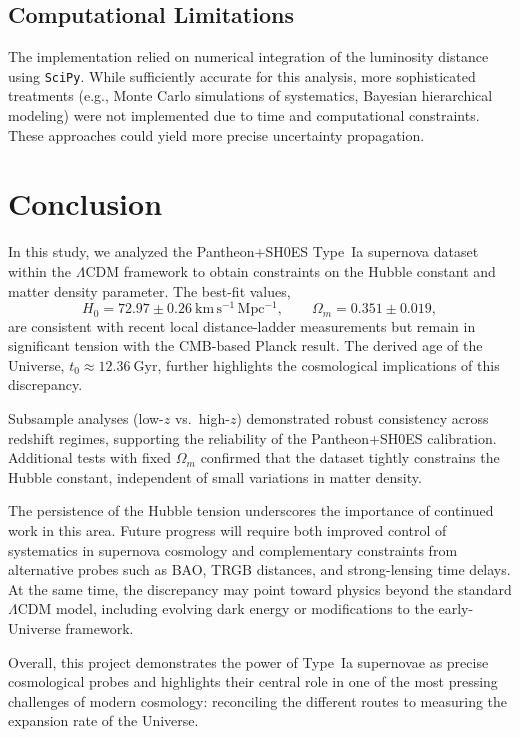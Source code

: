 \documentclass[12pt]{article}
\begin{document}
\subsection*{Computational Limitations}
The implementation relied on numerical integration of the luminosity distance using \texttt{SciPy}. While sufficiently accurate for this analysis, more sophisticated treatments 
(e.g., Monte Carlo simulations of systematics, Bayesian hierarchical modeling) were not implemented due to time and computational constraints. These approaches could yield more precise uncertainty propagation.

\section{Conclusion}
In this study, we analyzed the Pantheon+SH0ES Type~Ia supernova dataset within the $\Lambda$CDM framework to obtain constraints on the Hubble constant and matter density parameter. 
The best-fit values,
\[
H_0 = 72.97 \pm 0.26 \ \mathrm{km\,s^{-1}\,Mpc^{-1}}, \qquad \Omega_m = 0.351 \pm 0.019,
\]
are consistent with recent local distance-ladder measurements but remain in significant tension with the CMB-based Planck result. The derived age of the Universe, $t_0 \approx 12.36 \ \mathrm{Gyr}$, 
further highlights the cosmological implications of this discrepancy.

Subsample analyses (low-$z$ vs.\ high-$z$) demonstrated robust consistency across redshift regimes, supporting the reliability of the Pantheon+SH0ES calibration. Additional tests with 
fixed $\Omega_m$ confirmed that the dataset tightly constrains the Hubble constant, independent of small variations in matter density.

The persistence of the Hubble tension underscores the importance of continued work in this area. Future progress will require both improved control of systematics in supernova cosmology and complementary 
constraints from alternative probes such as BAO, TRGB distances, and strong-lensing time delays. At the same time, the discrepancy may point toward physics beyond the standard $\Lambda$CDM model, 
including evolving dark energy or modifications to the early-Universe framework.

Overall, this project demonstrates the power of Type~Ia supernovae as precise cosmological probes and highlights their central role in one of the most pressing challenges of modern cosmology: 
reconciling the different routes to measuring the expansion rate of the Universe.
\end{document}
